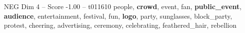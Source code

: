 \begin{textsample}{NEG Dim 4 – Score -1.00 – t011610}  \label{ex:f4_neg_022}
people, \textbf{crowd}, event, fan, \textbf{public\_event}, \textbf{audience}, entertainment, festival, fun, \textbf{logo}, party, sunglasses, block\_party, protest, cheering, advertising, ceremony, celebrating, feathered\_hair, rebellion

\end{textsample}
